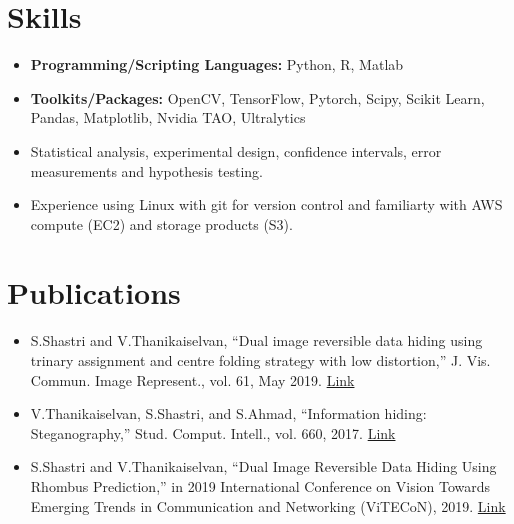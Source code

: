 \documentclass[a4paper,11pt]{article}
\begin{document}
\section{Skills}
	\begin{itemize}[leftmargin=*, itemsep = -2pt]
    \item{\textbf{Programming/Scripting Languages:} Python, R, Matlab}
		\item{\textbf{Toolkits/Packages:}{ OpenCV, TensorFlow, Pytorch, Scipy, Scikit Learn, Pandas, Matplotlib, Nvidia TAO, Ultralytics}}
		\item{Statistical analysis, experimental design, confidence intervals, error measurements and hypothesis testing.}
    \item{Experience using Linux with git for version control and familiarty with AWS compute (EC2) and storage products (S3).}
	\end{itemize}

\section{Publications}
	\begin{itemize}[leftmargin=*, itemsep = -4pt]
    \item{S.Shastri and V.Thanikaiselvan, “Dual image reversible data hiding using trinary assignment and centre folding strategy with low distortion,” J. Vis. Commun. Image Represent., vol. 61, May 2019. \href{https://doi.org/10.1016/j.jvcir.2019.03.022}{Link}}
		\item{V.Thanikaiselvan, S.Shastri, and S.Ahmad, “Information hiding: Steganography,” Stud. Comput. Intell., vol. 660, 2017. \href{https://doi.org/10.1007/978-3-319-44790-2\_4}{Link}}
    \item{S.Shastri and V.Thanikaiselvan, “Dual Image Reversible Data Hiding Using Rhombus Prediction,” in 2019 International Conference on Vision Towards Emerging Trends in Communication and Networking (ViTECoN), 2019. \href{https://doi.org/10.1109/ViTECoN.2019.8899667}{Link}}
   \end{itemize}
\end{document}
